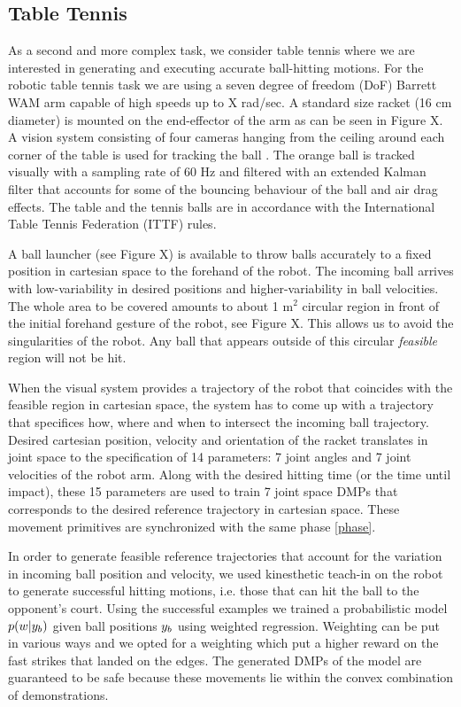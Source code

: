 \subsection{Table Tennis}


As a second and more complex task, we consider table tennis where we are interested in generating and executing accurate ball-hitting motions. For the robotic table tennis task we are using a seven degree of freedom (DoF) Barrett WAM arm capable of high speeds up to X rad/sec. A standard size racket (16 cm diameter) is mounted on the end-effector of the arm as can be seen in Figure X. A vision system consisting of four cameras hanging from the ceiling around each corner of the table is used for tracking the ball \cite{Lampert12}. The orange ball is tracked  visually with a sampling rate of 60 Hz and filtered with an extended Kalman filter that accounts for some of the bouncing behaviour of the ball and air drag effects. The table and the tennis balls are in accordance with the International Table Tennis Federation (ITTF) rules.

A ball launcher (see Figure X) is available to throw balls accurately to a fixed position in cartesian space to the forehand of the robot. The incoming ball arrives with low-variability in desired positions and higher-variability in ball velocities. The whole area to be covered amounts to about 1 m$^2$ circular region in front of the initial forehand gesture of the robot, see Figure X. This allows us to avoid the singularities of the robot. Any ball that appears outside of this circular \emph{feasible} region will not be hit.

When the visual system provides a trajectory of the robot that coincides with the feasible region in cartesian space, the system has to come up with a trajectory that specifices how, where and when to intersect the incoming ball trajectory. Desired cartesian position, velocity and orientation of the racket translates in joint space to the specification of 14 parameters: 7 joint angles and 7 joint velocities of the robot arm. Along with the desired hitting time (or the time until impact), these 15 parameters are used to train 7 joint space DMPs that corresponds to the desired reference trajectory in cartesian space. These movement primitives are synchronized with the same phase \eqref{phase}.

In order to generate feasible reference trajectories that account for the variation in incoming ball position and velocity, we used kinesthetic teach-in on the robot to generate successful hitting motions, i.e. those that can hit the ball to the opponent's court. Using the successful examples we trained a probabilistic model $p(w|y_b)$ given ball positions $y_b$ using weighted regression. Weighting can be put in various ways and we opted for a weighting which put a higher reward on the fast strikes that landed on the edges. The generated DMPs of the model are guaranteed to be safe because these movements lie within the convex combination of demonstrations. 

